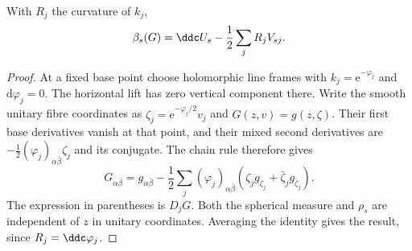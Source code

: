 \begin{lemma}\label{lem:convex-norm-horizontal-average}
With $R_j$ the curvature of $k_j$,
\[
 \beta_s(G)=\ddc U_s-\frac12\sum_jR_jV_{sj}.
\]
\end{lemma}
\begin{proof}
At a fixed base point choose holomorphic line frames with
$k_j=\mathrm e^{-\varphi_j}$ and $\mathrm d\varphi_j=0$. The horizontal lift has zero vertical component there. Write the smooth unitary fibre coordinates as
$\zeta_j=\mathrm e^{-\varphi_j/2}v_j$ and $G(z,v)=g(z,\zeta)$.
Their first base derivatives vanish at that point, and their mixed second derivatives are
$-\frac12(\varphi_j)_{\alpha\bar\beta}\zeta_j$ and its conjugate. The chain rule therefore gives
\[
 G_{\alpha\bar\beta}
 =g_{\alpha\bar\beta}-\frac12\sum_j(\varphi_j)_{\alpha\bar\beta}
       (\zeta_jg_{\zeta_j}+\bar\zeta_jg_{\bar\zeta_j}).
\]
The expression in parentheses is $D_jG$. Both the spherical measure and $\rho_s$ are independent of $z$ in unitary coordinates. Averaging the identity gives the result, since $R_j=\ddc\varphi_j$.
\end{proof}

